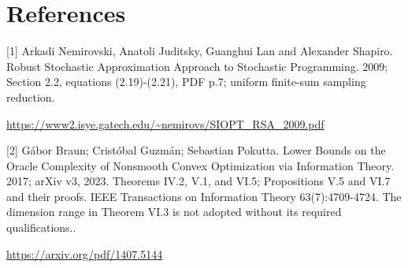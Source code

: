 \documentclass[10pt,a4paper]{article}
\begin{document}
\section{References}
[1] Arkadi Nemirovski, Anatoli Juditsky, Guanghui Lan and Alexander Shapiro. Robust Stochastic Approximation Approach to Stochastic Programming. 2009; Section 2.2, equations (2.19)-(2.21), PDF p.7; uniform finite-sum sampling reduction.

\url{https://www2.isye.gatech.edu/~nemirovs/SIOPT_RSA_2009.pdf}

[2] Gábor Braun; Cristóbal Guzmán; Sebastian Pokutta. Lower Bounds on the Oracle Complexity of Nonsmooth Convex Optimization via Information Theory. 2017; arXiv v3, 2023. Theorems IV.2, V.1, and VI.5; Propositions V.5 and VI.7 and their proofs. IEEE Transactions on Information Theory 63(7):4709-4724. The dimension range in Theorem VI.3 is not adopted without its required qualifications..

\url{https://arxiv.org/pdf/1407.5144}
\end{document}
